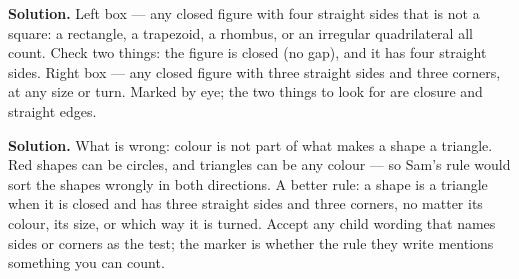 \documentclass[12pt]{article}
\begin{document}


\textbf{Solution.} Left box --- any closed figure with four straight sides that is not a square: a rectangle, a trapezoid, a rhombus, or an irregular quadrilateral all count. Check two things: the figure is closed (no gap), and it has four straight sides. Right box --- any closed figure with three straight sides and three corners, at any size or turn. Marked by eye; the two things to look for are closure and straight edges.


\textbf{Solution.} What is wrong: colour is not part of what makes a shape a triangle. Red shapes can be circles, and triangles can be any colour --- so Sam's rule would sort the shapes wrongly in both directions. A better rule: a shape is a triangle when it is closed and has three straight sides and three corners, no matter its colour, its size, or which way it is turned. Accept any child wording that names sides or corners as the test; the marker is whether the rule they write mentions something you can count.
\end{document}
